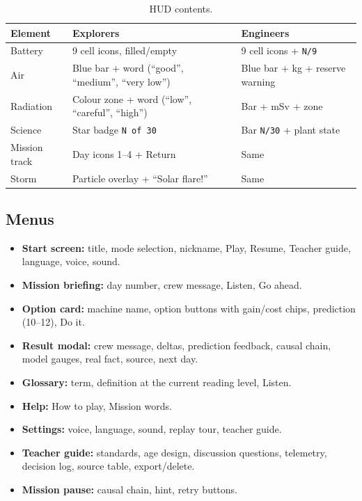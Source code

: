 \documentclass[11pt,a4paper]{article}
\newcommand{\code}[1]{\texttt{#1}}
\begin{document}
\begin{table}[H]
\centering
\small
\begin{tabular}{@{}p{3.0cm}p{5.6cm}p{5.8cm}@{}}
\toprule
\textbf{Element} & \textbf{Explorers} & \textbf{Engineers}\\
\midrule
Battery & 9 cell icons, filled/empty & 9 cell icons + \code{N/9}\\
Air & Blue bar + word (``good'', ``medium'', ``very low'') & Blue bar + kg + reserve warning\\
Radiation & Colour zone + word (``low'', ``careful'', ``high'') & Bar + mSv + zone\\
Science & Star badge \code{N of 30} & Bar \code{N/30} + plant state\\
Mission track & Day icons 1--4 + Return & Same\\
Storm & Particle overlay + ``Solar flare!'' & Same\\
\bottomrule
\end{tabular}
\caption{HUD contents.}
\label{tab:hud}
\end{table}

\subsection{Menus}

\begin{itemize}
  \item \textbf{Start screen:} title, mode selection, nickname, Play, Resume, Teacher guide, language, voice, sound.
  \item \textbf{Mission briefing:} day number, crew message, Listen, Go ahead.
  \item \textbf{Option card:} machine name, option buttons with gain/cost chips, prediction (10--12), Do it.
  \item \textbf{Result modal:} crew message, deltas, prediction feedback, causal chain, model gauges, real fact, source, next day.
  \item \textbf{Glossary:} term, definition at the current reading level, Listen.
  \item \textbf{Help:} How to play, Mission words.
  \item \textbf{Settings:} voice, language, sound, replay tour, teacher guide.
  \item \textbf{Teacher guide:} standards, age design, discussion questions, telemetry, decision log, source table, export/delete.
  \item \textbf{Mission pause:} causal chain, hint, retry buttons.
\end{itemize}
\end{document}
